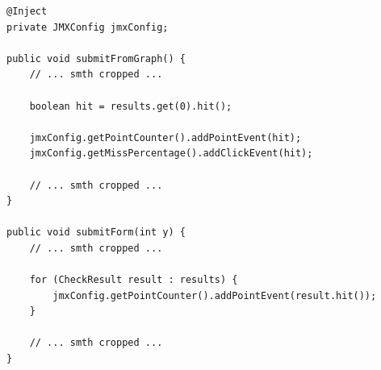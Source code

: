 \begin{lstlisting}[caption=Фрагмент интеграции \texttt{MBean}.]
@Inject
private JMXConfig jmxConfig;

public void submitFromGraph() {
    // ... smth cropped ...

    boolean hit = results.get(0).hit();
    
    jmxConfig.getPointCounter().addPointEvent(hit);
    jmxConfig.getMissPercentage().addClickEvent(hit);

    // ... smth cropped ...
}

public void submitForm(int y) {
    // ... smth cropped ...

    for (CheckResult result : results) {
        jmxConfig.getPointCounter().addPointEvent(result.hit());
    }

    // ... smth cropped ...
}
\end{lstlisting}